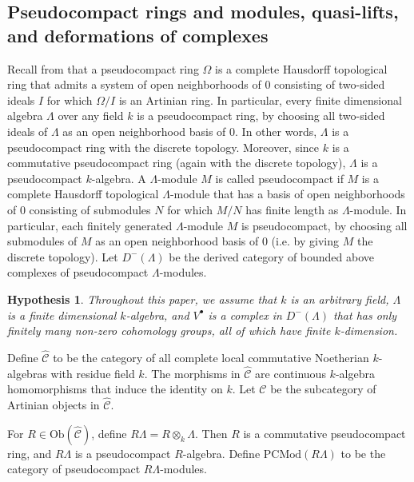 \documentclass{amsart}
\theoremstyle{plain}
\newtheorem{hypo}{Hypothesis}
\theoremstyle{definition}
\theoremstyle{remark}
\begin{document}
\subsection{Pseudocompact rings and modules, quasi-lifts, and deformations of complexes}
\label{s:setup}

Recall from \cite{brumer} 
that a pseudocompact ring $\Omega$ is a complete Hausdorff topological ring that admits a system 
of open neighborhoods of $0$ consisting of two-sided ideals $I$ for which $\Omega/I$ is an Artinian ring.
In particular, every finite dimensional algebra $\Lambda$ over any field $k$
is a pseudocompact ring, by choosing all two-sided ideals of $\Lambda$ as an 
open neighborhood basis of $0$. In other words, $\Lambda$ is a pseudocompact ring with the discrete
topology. Moreover, since $k$ is a commutative pseudocompact ring (again with the discrete topology),
$\Lambda$ is a pseudocompact $k$-algebra.
A $\Lambda$-module $M$ is called pseudocompact if $M$ is a complete Hausdorff topological 
$\Lambda$-module that has a basis of open neighborhoods  of $0$ consisting of submodules $N$ for which
$M/N$ has finite length as $\Lambda$-module. In particular, each finitely generated $\Lambda$-module
$M$ is pseudocompact, by choosing all submodules of $M$ as an open neighborhood basis of $0$
(i.e. by giving $M$ the discrete topology).
Let $D^-(\Lambda)$ be the derived category of bounded above complexes of pseudocompact
$\Lambda$-modules. 

\begin{hypo}
\label{hypo:fincoh}
Throughout this paper, we assume that $k$ is an arbitrary field, $\Lambda$ is a finite dimensional
$k$-algebra, and $V^\bullet $ is a
complex in $D^-(\Lambda)$ that has  only finitely many non-zero cohomology
groups, all of which have finite $k$-dimension.
\end{hypo}

Define $\hat{\mathcal{C}}$ to be the category of all complete local commutative Noetherian 
$k$-algebras with residue field $k$. The morphisms in $\hat{\mathcal{C}}$ are 
continuous $k$-algebra homomorphisms that induce the identity on $k$.
Let $\mathcal{C}$ be the subcategory of  Artinian objects in $\hat{\mathcal{C}}$.

For $R \in \mathrm{Ob}(\hat{\mathcal{C}})$, define $R\Lambda=R\otimes_k\Lambda$. 
Then $R$ is a commutative pseudocompact ring, and
$R\Lambda$ is a pseudocompact $R$-algebra. Define $\mathrm{PCMod}(R\Lambda)$ 
to be the category of pseudocompact $R\Lambda$-modules.
\end{document}

